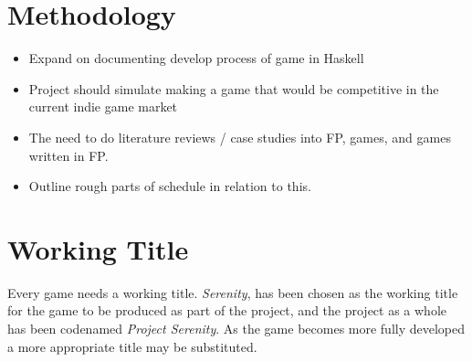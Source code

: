 \section{Methodology}

\begin{itemize}\itemsep-3pt
	\item Expand on documenting develop process of game in Haskell
	\item Project should simulate making a game that would be competitive in the current indie game market
	\item The need to do literature reviews / case studies into FP, games, and games written in FP.
	\item Outline rough parts of schedule in relation to this.
\end{itemize}




\section{Working Title}

Every game needs a working title. \emph{Serenity}, has been chosen as the working title for the game to be produced as part of the project, and the project as a whole has been codenamed \emph{Project Serenity}. As the game becomes more fully developed a more appropriate title may be substituted.